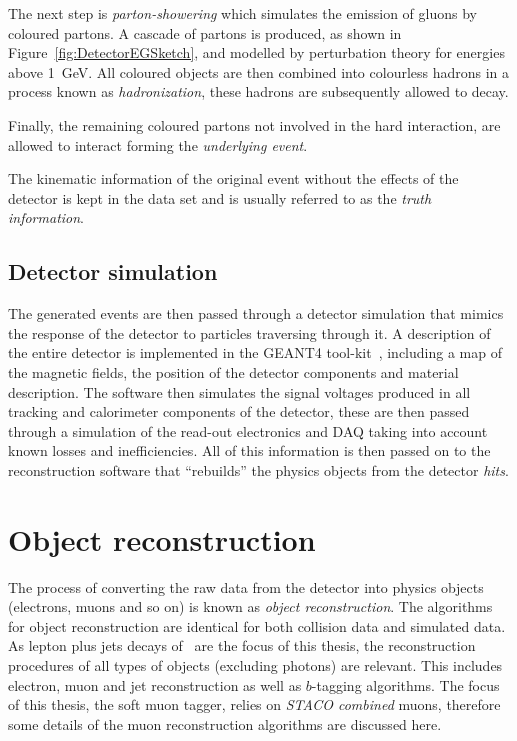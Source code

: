 The next step is \emph{parton-showering} which simulates the  emission of gluons by coloured partons. A cascade of partons is produced, as shown in Figure~\ref{fig:DetectorEGSketch}, and modelled by perturbation theory for energies above \SI{1}{GeV}. All coloured objects are then combined into colourless hadrons in a process known as \emph{hadronization}, these hadrons are subsequently allowed to decay.

Finally, the remaining coloured partons not involved in the hard interaction, are allowed to interact forming the \emph{underlying event}.

The kinematic information of the original event without the effects of the detector is kept in the data set and is usually referred to as the \emph{truth information}.

\subsection{Detector simulation} \label{sec:DetectorSimulation}

The generated events are then passed through a detector simulation that mimics the response of the detector to particles traversing through it. A description of the entire detector is implemented in the GEANT4 tool-kit~\cite{Detector:Geant4}, including a map of the magnetic fields, the position of the detector components and material description. The software then simulates the signal voltages produced in all tracking and calorimeter components of the detector, these are then passed through a simulation of the read-out electronics and DAQ taking into account known losses and inefficiencies. All of this information is then passed on to the reconstruction software that ``rebuilds'' the physics objects from the detector \emph{hits}.

\section{Object reconstruction} \label{sec:DetectorEventReco}

The process of converting the raw data from the detector into physics objects (electrons, muons and so on) is known as \emph{object reconstruction}. The algorithms for object reconstruction are identical for both collision data and simulated data. As lepton plus jets decays of \ttbar\ are the focus of this thesis, the reconstruction procedures of all types of objects (excluding photons) are relevant. This includes electron, muon and jet reconstruction as well as $b$-tagging algorithms. The focus of this thesis, the soft muon tagger, relies on \emph{STACO combined} muons, therefore some details of the muon reconstruction algorithms are discussed here.

